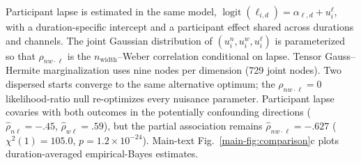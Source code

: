 \documentclass[Afour,sageh,times]{sagej}
\begin{document}
Participant lapse is estimated in the same model, $\operatorname{logit}(\ell_{i,d})=\alpha_{\ell,d}+u_i^\ell$, with a duration-specific intercept and a participant effect shared across durations and channels. The joint Gaussian distribution of $(u_i^n,u_i^w,u_i^\ell)$ is parameterized so that $\rho_{nw\cdot\ell}$ is the $n_{\mathrm{width}}$--Weber correlation conditional on lapse. Tensor Gauss--Hermite marginalization uses nine nodes per dimension (729 joint nodes). Two dispersed starts converge to the same alternative optimum; the $\rho_{nw\cdot\ell}=0$ likelihood-ratio null re-optimizes every nuisance parameter. Participant lapse covaries with both outcomes in the potentially confounding directions ($\hat\rho_{n\ell}=-.45$, $\hat\rho_{w\ell}=.59$), but the partial association remains $\hat\rho_{nw\cdot\ell}=-.627$ ($\chi^2(1)=105.0$, $p=1.2\times10^{-24}$). Main-text Fig.~\ref{main-fig:comparison}c plots duration-averaged empirical-Bayes estimates.




\end{document}
